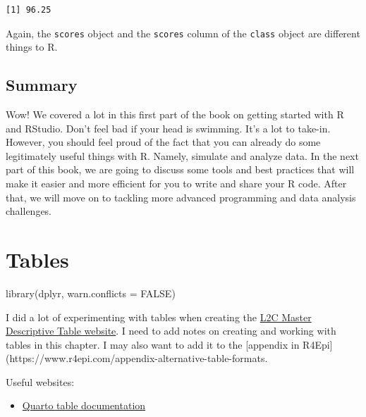 \documentclass[
  letterpaper,
  DIV=11,
  numbers=noendperiod]{scrreprt}
\newenvironment{Shaded}{\begin{snugshade}}{\end{snugshade}}
\newcommand{\AttributeTok}[1]{\textcolor[rgb]{0.40,0.45,0.13}{#1}}
\newcommand{\ConstantTok}[1]{\textcolor[rgb]{0.56,0.35,0.01}{#1}}
\newcommand{\FunctionTok}[1]{\textcolor[rgb]{0.28,0.35,0.67}{#1}}
\newcommand{\NormalTok}[1]{\textcolor[rgb]{0.00,0.23,0.31}{#1}}
\newcommand{\SpecialCharTok}[1]{\textcolor[rgb]{0.37,0.37,0.37}{#1}}
\providecommand{\tightlist}{%
  \setlength{\itemsep}{0pt}\setlength{\parskip}{0pt}}\usepackage{longtable,booktabs,array}
\begin{document}
\begin{Shaded}
\end{Shaded}

\begin{verbatim}
[1] 96.25
\end{verbatim}

Again, the \texttt{scores} object and the \texttt{scores} column of the
\texttt{class} object are different things to R.

\section{Summary}\label{summary}

Wow! We covered a lot in this first part of the book on getting started
with R and RStudio. Don't feel bad if your head is swimming. It's a lot
to take-in. However, you should feel proud of the fact that you can
already do some legitimately useful things with R. Namely, simulate and
analyze data. In the next part of this book, we are going to discuss
some tools and best practices that will make it easier and more
efficient for you to write and share your R code. After that, we will
move on to tackling more advanced programming and data analysis
challenges.

\chapter{Tables}\label{tables}

\begin{Shaded}
\begin{Highlighting}[]
\FunctionTok{library}\NormalTok{(dplyr, }\AttributeTok{warn.conflicts =} \ConstantTok{FALSE}\NormalTok{)}
\end{Highlighting}
\end{Shaded}

I did a lot of experimenting with tables when creating the
\href{https://brad-cannell.github.io/l2c_master_table/}{L2C Master
Descriptive Table website}. I need to add notes on creating and working
with tables in this chapter. I may also want to add it to the
{[}appendix in
R4Epi{]}(https://www.r4epi.com/appendix-alternative-table-formats.

Useful websites:

\begin{itemize}
\tightlist
\item
  \href{https://quarto.org/docs/authoring/tables.htm}{Quarto table
  documentation}
\end{itemize}
\end{document}
